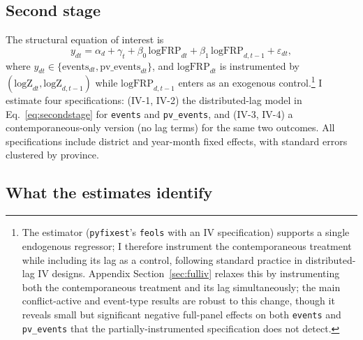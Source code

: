 \documentclass[12pt]{article}
\begin{document}
\subsection{Second stage}

The structural equation of interest is
\begin{equation}
y_{dt} = \alpha_d + \gamma_t + \beta_0\, \text{logFRP}_{dt} + \beta_1\, \text{logFRP}_{d,t-1} + \varepsilon_{dt},
\label{eq:secondstage}
\end{equation}
where $y_{dt} \in \{\text{events}_{dt}, \text{pv\_events}_{dt}\}$, and $\text{logFRP}_{dt}$ is instrumented by $(\text{logZ}_{dt}, \text{logZ}_{d,t-1})$ while $\text{logFRP}_{d,t-1}$ enters as an exogenous control.\footnote{The estimator (\texttt{pyfixest}'s \texttt{feols} with an IV specification) supports a single endogenous regressor; I therefore instrument the contemporaneous treatment while including its lag as a control, following standard practice in distributed-lag IV designs. Appendix Section~\ref{sec:fulliv} relaxes this by instrumenting both the contemporaneous treatment and its lag simultaneously; the main conflict-active and event-type results are robust to this change, though it reveals small but significant negative full-panel effects on both \texttt{events} and \texttt{pv\_events} that the partially-instrumented specification does not detect.} I estimate four specifications: (IV-1, IV-2) the distributed-lag model in Eq.~\eqref{eq:secondstage} for \texttt{events} and \texttt{pv\_events}, and (IV-3, IV-4) a contemporaneous-only version (no lag terms) for the same two outcomes. All specifications include district and year-month fixed effects, with standard errors clustered by province.

\subsection{What the estimates identify}
\label{sec:estimand}
\end{document}
